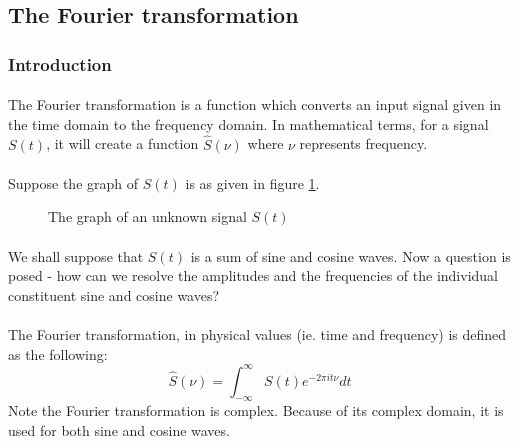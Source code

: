 \documentclass{article}
\begin{document}
\subsection{The Fourier transformation}

\subsubsection{Introduction}

\paragraph*{}
The Fourier transformation is a function which converts an input signal given
in the time domain to the frequency domain. In mathematical terms, for a
signal $S(t)$, it will create a function $\hat{S}(\nu)$ where $\nu$ represents
frequency.

\paragraph{} 
Suppose the graph of $S(t)$ is as given in figure \ref{fig:unk-func}.
\begin{figure}[ht]
	\centering
	\caption{The graph of an unknown signal $S(t)$}
	\label{fig:unk-func}
\end{figure}

\paragraph*{}
We shall suppose that $S(t)$ is a sum of sine and cosine waves. Now a question
is posed - how can we resolve the amplitudes and the frequencies of the
individual constituent sine and cosine waves?

\paragraph*{}
The Fourier transformation, in physical values (ie. time and frequency) is
defined as the following:
$$\hat{S}(\nu) = \int_{-\infty}^{\infty} S(t) e^{-2 \pi i t \nu} dt$$
Note the Fourier transformation is complex. Because of its complex domain, it
is used for both sine and cosine waves.
\end{document}
